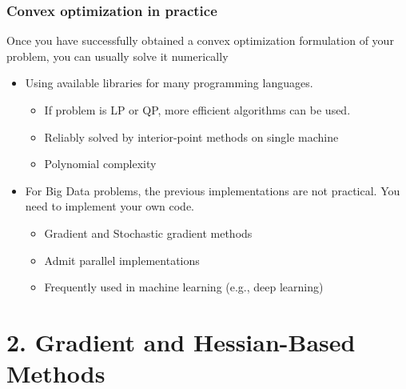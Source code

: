 \documentclass{beamer}
\begin{document}
\begin{frame}

	\frametitle{Convex optimization in practice}

Once you have successfully obtained a convex optimization formulation of your problem, you can usually solve it numerically

	\begin{itemize}
		\item Using available libraries for many programming languages.\\
		\begin{itemize}
			\item If problem is LP or QP, more efficient algorithms can be used.
			\item Reliably solved by interior-point methods on single machine
			\item Polynomial complexity
		\end{itemize}
		\item For Big Data problems, the previous implementations are not practical. You need to implement your own code.
		\begin{itemize}
			\item Gradient and Stochastic gradient methods
			\item Admit parallel implementations
			\item Frequently used in machine learning (e.g., deep learning)
		\end{itemize}
	\end{itemize}


\end{frame}


\section{2. Gradient and Hessian-Based Methods}
\end{document}
